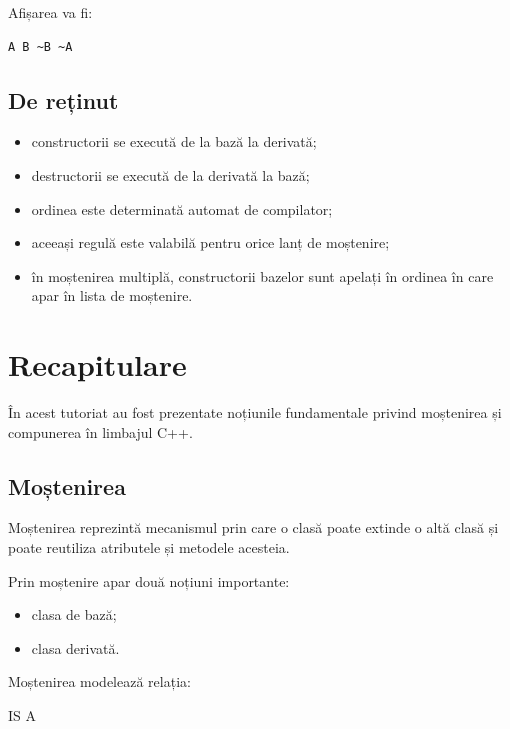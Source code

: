 \documentclass[12pt,a4paper]{article}
\begin{document}
Afișarea va fi:

\begin{verbatim}
A B ~B ~A
\end{verbatim}

\subsection{De reținut}

\begin{itemize}
\item constructorii se execută de la bază la derivată;
\item destructorii se execută de la derivată la bază;
\item ordinea este determinată automat de compilator;
\item aceeași regulă este valabilă pentru orice lanț de moștenire;
\item în moștenirea multiplă, constructorii bazelor sunt apelați în ordinea în care apar în lista de moștenire.
\end{itemize}








\section{Recapitulare}

În acest tutoriat au fost prezentate noțiunile fundamentale privind moștenirea și compunerea în limbajul C++.

\subsection{Moștenirea}

Moștenirea reprezintă mecanismul prin care o clasă poate extinde o altă clasă și poate reutiliza atributele și metodele acesteia.

Prin moștenire apar două noțiuni importante:

\begin{itemize}
\item clasa de bază;
\item clasa derivată.
\end{itemize}

Moștenirea modelează relația:

\begin{center}
IS A
\end{center}
\end{document}
